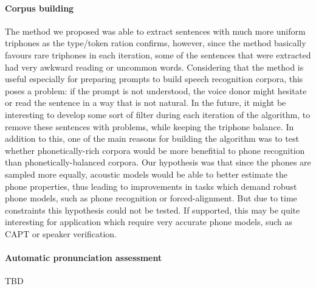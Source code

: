 \paragraph*{Corpus building}
The method we proposed was able to extract sentences with much more uniform triphones as the type/token ration confirms, however, since the method basically favours rare triphones in each iteration, some of the sentences that were extracted had very awkward reading or uncommon words. Considering that the method is useful especially for preparing prompts to build speech recognition corpora, this poses a problem: if the prompt is not understood, the voice donor might hesitate or read the sentence in a way that is not natural. In the future, it might be interesting to develop some sort of filter during each iteration of the algorithm, to remove these sentences with problems, while keeping the triphone balance. In addition to this, one of the main reasons for building the algorithm was to test whether phonetically-rich corpora would be more benefitial to phone recognition than phonetically-balanced corpora. Our hypothesis was that  since the phones are sampled more equally, acoustic models would be able to better estimate the phone properties, thus leading to improvements in tasks which demand robust phone models, such as phone recognition or forced-alignment. But due to time constraints this hypothesis could not be tested. If supported, this may be quite interesting for application which require very accurate phone models, such as \ac{CAPT} or speaker verification.

\paragraph*{Automatic pronunciation assessment}
TBD





